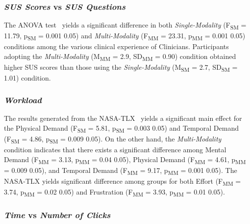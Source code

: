 \subsubsection{\textit{SUS Scores} vs \textit{SUS Questions}}

The ANOVA test\footnotemark[3]~\cite{Wobbrock:2011:ART:1978942.1978963} yields a significant difference in both \textit{Single-Modality} (F\textsubscript{SM} = 11.79, p\textsubscript{SM} = 0.001  0.05) and \textit{Multi-Modality} (F\textsubscript{MM} = 23.31, p\textsubscript{MM} = 0.001  0.05) conditions among the various clinical experience of Clinicians.
Participants adopting the \textit{Multi-Modality} (M\textsubscript{MM} = 2.9, SD\textsubscript{MM} = 0.90) condition obtained higher SUS scores than those using the \textit{Single-Modality} (M\textsubscript{SM} = 2.7, SD\textsubscript{SM} = 1.01) condition.


\subsubsection{\textit{Workload}}

The results generated from the NASA-TLX~\cite{10.1145/3290605.3300592} yields a significant main effect for the Physical Demand (F\textsubscript{SM} = 5.81, p\textsubscript{SM} = 0.003  0.05) and Temporal Demand (F\textsubscript{SM} = 4.86, p\textsubscript{SM} = 0.009  0.05).
On the other hand, the \textit{Multi-Modality} condition indicates that there exists a significant difference among Mental Demand (F\textsubscript{MM} = 3.13, p\textsubscript{MM} = 0.04  0.05), Physical Demand (F\textsubscript{MM} = 4.61, p\textsubscript{MM} = 0.009  0.05), and Temporal Demand (F\textsubscript{MM} = 9.17, p\textsubscript{MM} = 0.001  0.05).
The NASA-TLX yields significant difference among groups for both Effort (F\textsubscript{MM} = 3.74, p\textsubscript{MM} = 0.02  0.05) and Frustration (F\textsubscript{MM} = 3.93, p\textsubscript{MM} = 0.01  0.05).

\balance

\subsubsection{\textit{Time} vs \textit{Number of Clicks}}

